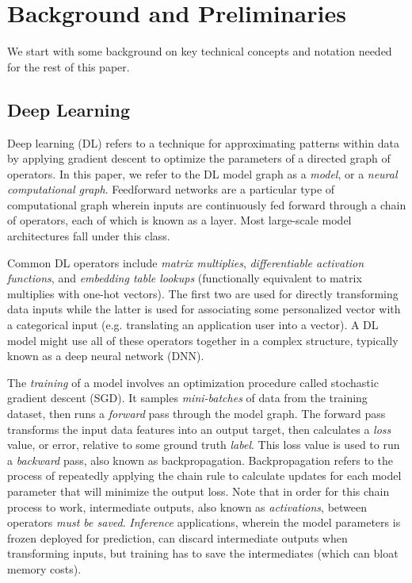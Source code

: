 
\section{Background and Preliminaries}
\label{sec:background}
We start with some background on key technical concepts and notation needed for the rest of this paper.
\subsection{Deep Learning}
Deep learning (DL) refers to a technique for approximating patterns within data by applying gradient descent to optimize the parameters of a directed graph of operators. In this paper, we refer to the DL model graph as a \textit{model}, or a \textit{neural computational graph}. Feedforward networks are a particular type of computational graph wherein inputs are continuously fed forward through a chain of operators, each of which is known as a layer. Most large-scale model architectures fall under this class.

Common DL operators include \textit{matrix multiplies}, \textit{differentiable activation functions}, and \textit{embedding table lookups} (functionally equivalent to matrix multiplies with one-hot vectors). The first two are used for directly transforming data inputs while the latter is used for associating some personalized vector with a categorical input (e.g. translating an application user into a vector). A DL model might use all of these operators together in a complex structure, typically known as a deep neural network (DNN).

The \textit{training} of a model involves an optimization procedure called stochastic gradient descent (SGD). It samples \textit{mini-batches} of data from the training dataset, then runs a \textit{forward} pass through the model graph. The forward pass transforms the input data features into an output target, then calculates a \textit{loss} value, or error, relative to some ground truth \textit{label}. This loss value is used to run a \textit{backward} pass, also known as backpropagation. Backpropagation refers to the process of repeatedly applying the chain rule to calculate updates for each model parameter that will minimize the output loss. Note that in order for this chain process to work, intermediate outputs, also known as \textit{activations}, between operators \textit{must be saved}. \textit{Inference} applications, wherein the model parameters is frozen deployed for prediction, can discard intermediate outputs when transforming inputs, but training has to save the intermediates (which can bloat memory costs).

